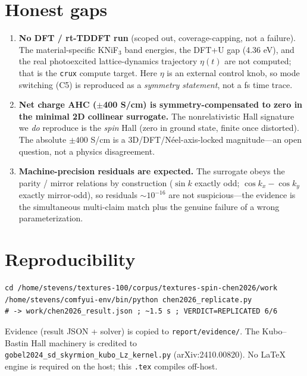 \documentclass[11pt]{article}
\begin{document}
\section{Honest gaps}\label{sec:gaps}
\begin{enumerate}
\item \textbf{No DFT / rt-TDDFT run} (scoped out, coverage-capping, not a failure). The
material-specific KNiF$_3$ band energies, the DFT+U gap (4.36 eV), and the real
photoexcited lattice-dynamics trajectory $\eta(t)$ are not computed; that is the
\texttt{crux} compute target. Here $\eta$ is an external control knob, so mode switching
(C5) is reproduced as a \emph{symmetry statement}, not a fs time trace.
\item \textbf{Net charge AHC ($\pm$400 S/cm) is symmetry-compensated to zero in the minimal
2D collinear surrogate.} The nonrelativistic Hall signature we \emph{do} reproduce is the
\emph{spin} Hall (zero in ground state, finite once distorted). The absolute $\pm400$ S/cm
is a 3D/DFT/N\'eel-axis-locked magnitude---an open question, not a physics disagreement.
\item \textbf{Machine-precision residuals are expected.} The surrogate obeys the parity /
mirror relations by construction ($\sin k$ exactly odd; $\cos k_x-\cos k_y$ exactly
mirror-odd), so residuals $\sim10^{-16}$ are not suspicious---the evidence is the
simultaneous multi-claim match plus the genuine failure of a wrong parameterization.
\end{enumerate}

\section{Reproducibility}
\begin{verbatim}
cd /home/stevens/textures-100/corpus/textures-spin-chen2026/work
/home/stevens/comfyui-env/bin/python chen2026_replicate.py
# -> work/chen2026_result.json ; ~1.5 s ; VERDICT=REPLICATED 6/6
\end{verbatim}
Evidence (result JSON + solver) is copied to \texttt{report/evidence/}. The Kubo--Bastin
Hall machinery is credited to \texttt{gobel2024\_sd\_skyrmion\_kubo\_Lz\_kernel.py}
(arXiv:2410.00820). No LaTeX engine is required on the host; this \texttt{.tex} compiles
off-host.
\end{document}

